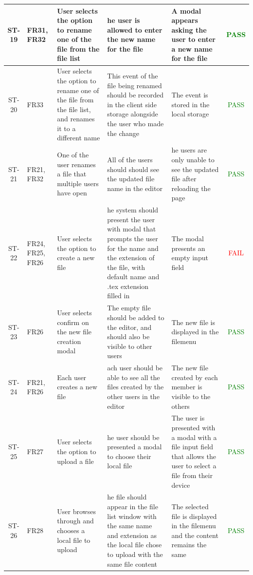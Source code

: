 \documentclass[12pt, titlepage]{article}
\begin{document}
\begin{center}
\begin{longtable}{|c|p{1cm}|p{2.7cm}|p{3cm}|p{3cm}|c|}
        \hline
        ST-19 & FR31, FR32 & User selects the option to rename one of the file from the file list & he user is allowed to enter the new name for the file & A modal appears asking the user to enter a new name for the file & \textcolor{green}{PASS} \\
        \hline
        ST-20 & FR33 & User selects the option to rename one of the file from the file list, and renames it to a different name & This event of the file being renamed should be recorded in the client side storage alongside the user who made the change & The event is stored in the local storage & \textcolor{green}{PASS}  \\
        \hline
        ST-21 & FR21, FR32 & One of the user renames a file that multiple users have open & All of the users should should see the updated file name in the editor & he users are only unable to see the updated file after reloading the page & \textcolor{green}{PASS} \\
        \hline
        ST-22 & FR24, FR25, FR26 & User selects the option to create a new file & he system should present the user with modal that prompts the user for the name and the extension of the file, with default name and .tex extension filled in & The modal presents an empty input field &  \textcolor{red}{FAIL} \\
        \hline
        ST-23 & FR26 & User selects confirm on the new file creation modal & The empty file should be added to the editor, and should also be visible to other users & The new file is displayed in the filemenu &  \textcolor{green}{PASS} \\
        \hline
        ST-24 & FR21, FR26 & Each user creates a new file & ach user should be able to see all the files created by the other users in the editor & The new file created by each member is visible to the others & \textcolor{green}{PASS}  \\
        \hline
        ST-25 & FR27 &  User selects the option to upload a file & he user should be presented a modal to choose their local file & The user is presented with a modal with a file input field that allows the user to select a file from their device &  \textcolor{green}{PASS}  \\
        \hline
        ST-26 & FR28 & User browses through and chooses a local file to upload & he file should appear in the file list window with the same name and extension as the local file chose to upload with the same file content & The selected file is displayed in the filemenu and the content remains the same & \textcolor{green}{PASS} \\

\end{longtable}
\end{center}
\end{document}
